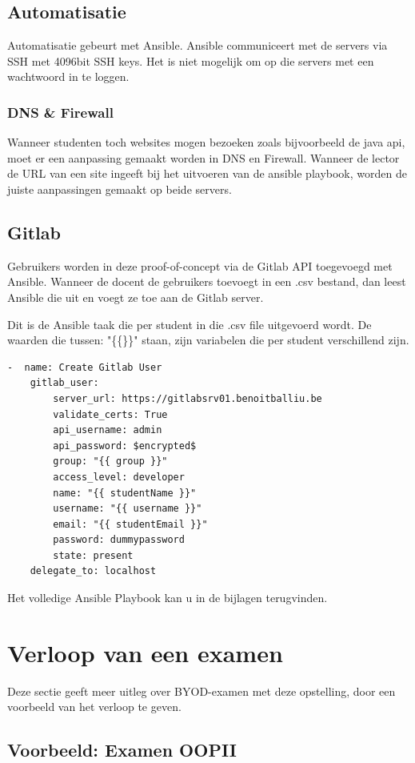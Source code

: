 \subsection{Automatisatie}
Automatisatie gebeurt met Ansible. Ansible communiceert met de servers via SSH met 4096bit SSH keys. Het is niet mogelijk om op die servers met een wachtwoord in te loggen.

\subsubsection{DNS \& Firewall}
Wanneer studenten toch websites mogen bezoeken zoals bijvoorbeeld de java api, moet er een aanpassing gemaakt worden in DNS en Firewall. Wanneer de lector de URL van een site ingeeft bij het uitvoeren van de ansible playbook, worden de juiste aanpassingen gemaakt op beide servers.

\subsection{Gitlab}
Gebruikers worden in deze proof-of-concept via de Gitlab API toegevoegd met Ansible. Wanneer de docent de gebruikers toevoegt in een .csv bestand, dan leest Ansible die uit en voegt ze toe aan de Gitlab server. 

Dit is de Ansible taak die per student in die .csv file uitgevoerd wordt. De waarden die tussen: "\{\{\}\}"   staan, zijn variabelen die per student verschillend zijn.
\lstset{basicstyle=\ttfamily}
\begin{lstlisting}
-  name: Create Gitlab User
	gitlab_user:
		server_url: https://gitlabsrv01.benoitballiu.be
		validate_certs: True
		api_username: admin
		api_password: $encrypted$
		group: "{{ group }}"
		access_level: developer
		name: "{{ studentName }}"
		username: "{{ username }}"
		email: "{{ studentEmail }}"
		password: dummypassword
		state: present
	delegate_to: localhost
\end{lstlisting}

Het volledige Ansible Playbook kan u in de bijlagen terugvinden.

\section{Verloop van een examen}
Deze sectie geeft meer uitleg over BYOD-examen met deze opstelling, door een voorbeeld van het verloop te geven.

\subsection{Voorbeeld: Examen OOPII}

